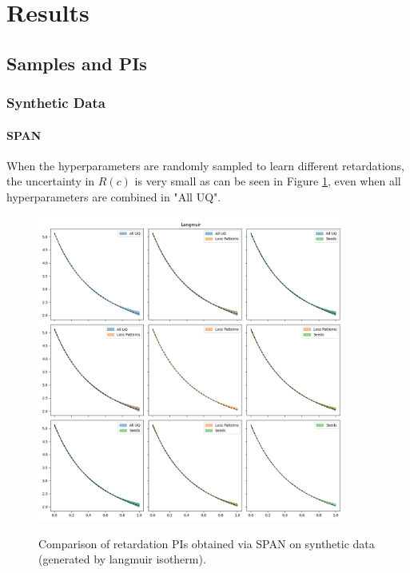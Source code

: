 \documentclass{article}
\begin{document}
\section{Results}
\subsection{Samples and PIs}
\subsubsection{Synthetic Data}

\paragraph{SPAN}
When the hyperparameters are randomly sampled to learn different retardations, the uncertainty in $R(c)$ is very small as can be seen in Figure \ref{fig:synthetic_SPAN_factors_PIs}, even when all hyperparameters are combined in "All UQ".

\begin{figure}
    \centering
    \includegraphics[width=0.9\textwidth]{figs/finn_synthetic_SPAN_factors_PIs.png}
    \label{fig:synthetic_SPAN_factors_PIs}
    \caption{Comparison of retardation PIs obtained via SPAN on synthetic data (generated by langmuir isotherm).}
\end{figure}
\end{document}
